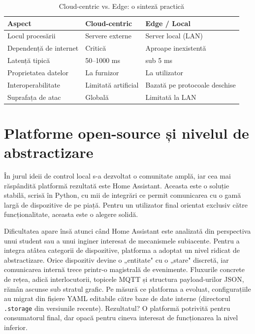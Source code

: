 \begin{table}[htb]
    \centering
        \renewcommand{\arraystretch}{1.4}
    \small
    \begin{tabular}{|p{4cm}|p{5cm}|p{5cm}|}
        \hline
        \textbf{Aspect} & \textbf{Cloud-centric} & \textbf{Edge / Local} \\ \hline
        Locul procesării & Servere externe & Server local (LAN) \\ \hline
        Dependență de internet & Critică & Aproape inexistentă \\ \hline
        Latență tipică & 50--1000 ms & sub 5 ms \\ \hline
        Proprietatea datelor & La furnizor & La utilizator \\ \hline
        Interoperabilitate & Limitată artificial & Bazată pe protocoale deschise \\ \hline
        Suprafața de atac & Globală & Limitată la LAN \\ \hline
    \end{tabular}
    \caption{Cloud-centric vs. Edge: o sinteză practică}
    \label{tab:cloud_vs_edge}
\end{table}

\section*{Platforme open-source și nivelul de abstractizare}
În jurul ideii de control local s-a dezvoltat o comunitate amplă, iar cea mai răspândită platformă rezultată este Home Assistant. Aceasta este o soluție stabilă, scrisă în Python, cu mii de integrări ce permit comunicarea cu o gamă largă de dispozitive de pe piață. Pentru un utilizator final orientat exclusiv către funcționalitate, aceasta este o alegere solidă.

Dificultatea apare însă atunci când Home Assistant este analizată din perspectiva unui student sau a unui inginer interesat de mecanismele subiacente. Pentru a integra atâtea categorii de dispozitive, platforma a adoptat un nivel ridicat de abstractizare. Orice dispozitiv devine o „entitate" cu o „stare" discretă, iar comunicarea internă trece printr-o magistrală de evenimente. Fluxurile concrete de rețea, adică interlocutorii, topicele MQTT și structura payload-urilor JSON, rămân ascunse sub stratul grafic. Pe măsură ce platforma a evoluat, configurațiile au migrat din fișiere YAML editabile către baze de date interne (directorul \texttt{.storage} din versiunile recente). Rezultatul? O platformă potrivită pentru consumatorul final, dar opacă pentru cineva interesat de funcționarea la nivel inferior.

